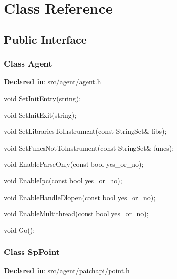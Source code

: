 \section{Class Reference}

\subsection{Public Interface}
\subsubsection{Class Agent}
\textbf{Declared in}: src/agent/agent.h

\begin{apient}
void SetInitEntry(string);
\end{apient}
\apidesc{
}

\begin{apient}
void SetInitExit(string);
\end{apient}
\apidesc{
}

\begin{apient}
void SetLibrariesToInstrument(const StringSet& libs);
\end{apient}
\apidesc{
}

\begin{apient}
void SetFuncsNotToInstrument(const StringSet& funcs);
\end{apient}
\apidesc{
}

\begin{apient}
void EnableParseOnly(const bool yes_or_no);
\end{apient}
\apidesc{
}

\begin{apient}
void EnableIpc(const bool yes_or_no);
\end{apient}
\apidesc{
}

\begin{apient}
void EnableHandleDlopen(const bool yes_or_no);
\end{apient}
\apidesc{
}

\begin{apient}
void EnableMultithread(const bool yes_or_no);
\end{apient}
\apidesc{
}

\begin{apient}
void Go();
\end{apient}
\apidesc{
}

\subsubsection{Class SpPoint}
\textbf{Declared in}: src/agent/patchapi/point.h

